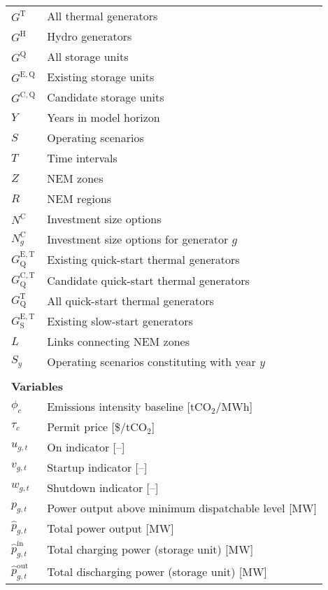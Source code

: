 \documentclass{article}
\newcommand{\sGeneratorsThermal}{G^{\mathrm{T}}}
\newcommand{\sGeneratorsHydro}{G^{\mathrm{H}}}
\newcommand{\sStorage}{G^{\mathrm{Q}}}
\newcommand{\sStorageExisting}{G^{\mathrm{E,Q}}}
\newcommand{\sStorageCandidate}{G^{\mathrm{C,Q}}}
\newcommand{\sYears}{Y}
\newcommand{\sScenarios}{S}
\newcommand{\sIntervals}{T}
\newcommand{\sZones}{Z}
\newcommand{\sRegions}{R}
\newcommand{\sInvestmentSizeOptions}{N^{\mathrm{C}}}
\newcommand{\sInvestmentSizeOptionsGenerator}[1][\iGenerator]{\sInvestmentSizeOptions_{#1}}
\newcommand{\sGeneratorsExistingThermalQuickStart}{G^{\mathrm{E,T}}_\mathrm{Q}}
\newcommand{\sGeneratorsCandidateThermalQuickStart}{G^{\mathrm{C,T}}_\mathrm{Q}}
\newcommand{\sGeneratorsThermalQuickStart}{G^{\mathrm{T}}_\mathrm{Q}}
\newcommand{\sGeneratorsExistingThermalSlowStart}{G^{\mathrm{E,T}}_\mathrm{S}}
\newcommand{\sLinks}{L}
\newcommand{\sScenariosYear}{\sScenarios_{\iYear}}
\newcommand{\iGenerator}{g}
\newcommand{\iYear}{y}
\newcommand{\iInterval}{t}
\newcommand{\iCalibrationInterval}{c}
\newcommand{\vBaseline}[1][\iCalibrationInterval]{\phi_{#1}}
\newcommand{\vPermitPrice}[1][\iCalibrationInterval]{\tau_{#1}}
\newcommand{\vStartupIndicator}[1][\iGenerator,\iInterval]{v_{#1}}
\newcommand{\vShutdownIndicator}[1][\iGenerator,\iInterval]{w_{#1}}
\newcommand{\vOnIndicator}[1][\iGenerator,\iInterval]{u_{#1}}
\newcommand{\vPower}[1][\iGenerator,\iInterval]{p_{#1}}
\newcommand{\vPowerTotal}[1][\iGenerator,\iInterval]{\hat{p}_{#1}}
\newcommand{\vPowerTotalIn}[1][\iGenerator,\iInterval]{\hat{p}^{\mathrm{in}}_{#1}}
\newcommand{\vPowerTotalOut}[1][\iGenerator,\iInterval]{\hat{p}^{\mathrm{out}}_{#1}}
\begin{document}
\begin{longtable}{ p{}  p{}}
	$\sGeneratorsThermal$ & All thermal generators\\
	$\sGeneratorsHydro$ & Hydro generators\\
	$\sStorage$ & All storage units\\
	$\sStorageExisting$ & Existing storage units\\
	$\sStorageCandidate$ & Candidate storage units\\
	$\sYears$ & Years in model horizon\\
	$\sScenarios$ & Operating scenarios\\
	$\sIntervals$ & Time intervals\\
	$\sZones$ & NEM zones\\
	$\sRegions$ & NEM regions\\
	$\sInvestmentSizeOptions$ & Investment size options\\
	$\sInvestmentSizeOptionsGenerator$ & Investment size options for generator $\iGenerator$\\
	$\sGeneratorsExistingThermalQuickStart$ & Existing quick-start thermal generators\\
	$\sGeneratorsCandidateThermalQuickStart$ & Candidate quick-start thermal generators\\
	$\sGeneratorsThermalQuickStart$ & All quick-start thermal generators\\
	$\sGeneratorsExistingThermalSlowStart$ & Existing slow-start generators\\
	$\sLinks$ & Links connecting NEM zones\\
	$\sScenariosYear$ & Operating scenarios constituting with year $\iYear$\\
	& \\
	\multicolumn{2}{l}{\textbf{Variables}}\\
	$\vBaseline$ & Emissions intensity baseline [tCO$_{2}$/MWh]\\
	$\vPermitPrice$ & Permit price [\$/tCO$_{2}$]\\

	$\vOnIndicator$ & On indicator [--]\\
	$\vStartupIndicator$ & Startup indicator [--]\\
	$\vShutdownIndicator$ & Shutdown indicator [--]\\

	$\vPower$ & Power output above minimum dispatchable level [MW]\\
	$\vPowerTotal$ & Total power output [MW]\\
	$\vPowerTotalIn$ & Total charging power (storage unit) [MW]\\
	$\vPowerTotalOut$ & Total discharging power (storage unit) [MW]\\


\end{longtable}
\end{document}
